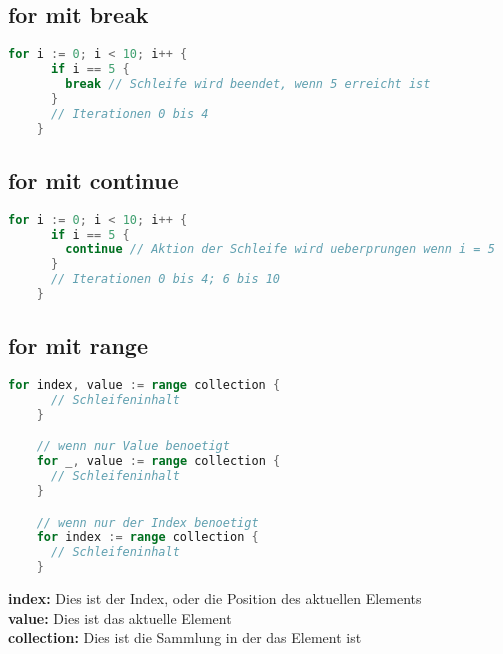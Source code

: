 \documentclass[twoside,a4paper,12pt]{article}
\begin{document}
\subsection{for mit break}
\begin{center}
  \begin{minipage}{1.0\textwidth}
    \begin{lstlisting}[language=Go]
    for i := 0; i < 10; i++ {
      if i == 5 {
        break // Schleife wird beendet, wenn 5 erreicht ist
      }
      // Iterationen 0 bis 4
    }
    \end{lstlisting}
  \end{minipage}
\end{center}

\subsection{for mit continue}
\begin{center}
  \begin{minipage}{1.0\textwidth}
    \begin{lstlisting}[language=Go]
    for i := 0; i < 10; i++ {
      if i == 5 {
        continue // Aktion der Schleife wird ueberprungen wenn i = 5 
      }
      // Iterationen 0 bis 4; 6 bis 10
    }
    \end{lstlisting}
  \end{minipage}
\end{center}

\subsection{for mit range}
\begin{center}
  \begin{minipage}{1.0\textwidth}
    \begin{lstlisting}[language=Go]
    for index, value := range collection {
      // Schleifeninhalt
    }

    // wenn nur Value benoetigt
    for _, value := range collection { 
      // Schleifeninhalt
    }

    // wenn nur der Index benoetigt 
    for index := range collection {
      // Schleifeninhalt 
    }
    \end{lstlisting}
  \end{minipage}
\end{center}
\textbf{index:} Dies ist der Index, oder die Position des aktuellen Elements \\ 
\textbf{value:} Dies ist das aktuelle Element \\ 
\textbf{collection:} Dies ist die Sammlung in der das Element ist \\
\end{document}
